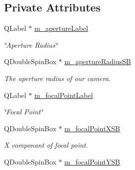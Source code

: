 \subsection*{Private Attributes}
\begin{DoxyCompactItemize}
\item 
\hypertarget{class_camera_widget_a7096b1c7d9d37fc5c981a079e1963b89}{Q\-Label $\ast$ \hyperlink{class_camera_widget_a7096b1c7d9d37fc5c981a079e1963b89}{m\-\_\-aperture\-Label}}\label{class_camera_widget_a7096b1c7d9d37fc5c981a079e1963b89}

\begin{DoxyCompactList}\small\item\em \char`\"{}\-Aperture Radius\char`\"{} \end{DoxyCompactList}\item 
\hypertarget{class_camera_widget_a6a36053193d17510092a539742a5c1c1}{Q\-Double\-Spin\-Box $\ast$ \hyperlink{class_camera_widget_a6a36053193d17510092a539742a5c1c1}{m\-\_\-aperture\-Radius\-S\-B}}\label{class_camera_widget_a6a36053193d17510092a539742a5c1c1}

\begin{DoxyCompactList}\small\item\em The aperture radius of our camera. \end{DoxyCompactList}\item 
\hypertarget{class_camera_widget_a7bab43f24bafeeacae680392bfe4fb01}{Q\-Label $\ast$ \hyperlink{class_camera_widget_a7bab43f24bafeeacae680392bfe4fb01}{m\-\_\-focal\-Point\-Label}}\label{class_camera_widget_a7bab43f24bafeeacae680392bfe4fb01}

\begin{DoxyCompactList}\small\item\em \char`\"{}\-Focal Point\char`\"{} \end{DoxyCompactList}\item 
\hypertarget{class_camera_widget_a94cbeedaabf12cff56da2c5101b72550}{Q\-Double\-Spin\-Box $\ast$ \hyperlink{class_camera_widget_a94cbeedaabf12cff56da2c5101b72550}{m\-\_\-focal\-Point\-X\-S\-B}}\label{class_camera_widget_a94cbeedaabf12cff56da2c5101b72550}

\begin{DoxyCompactList}\small\item\em X componant of focal point. \end{DoxyCompactList}\item 
\hypertarget{class_camera_widget_a18e05f4dd656799f60f6bd520e6a8e5e}{Q\-Double\-Spin\-Box $\ast$ \hyperlink{class_camera_widget_a18e05f4dd656799f60f6bd520e6a8e5e}{m\-\_\-focal\-Point\-Y\-S\-B}}\label{class_camera_widget_a18e05f4dd656799f60f6bd520e6a8e5e}


\end{DoxyCompactItemize}
